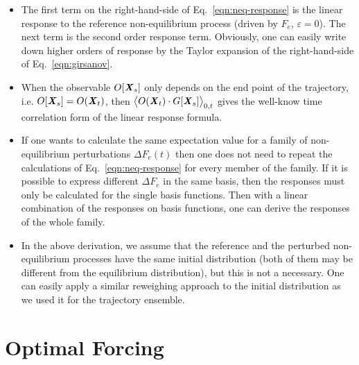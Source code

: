 \documentclass[aip,jcp,a4paper,reprint,onecolumn]{revtex4-1}
\newcommand{\vect}[1]{\textbf{\textit{#1}}}
\newcommand{\eps}{\varepsilon}
\begin{document}
\begin{itemize}
\item The first term on the right-hand-side of Eq.~\eqref{eqn:neq-response} is the linear
  response to the reference non-equilibrium process (driven by $F_e$, $\eps=0$). The next term is the second order response term. Obviously, one can easily write down higher orders of response by the Taylor expansion of the right-hand-side of Eq.~\eqref{eqn:girsanov}.
\item When the observable $O[\vect X_s]$ only depends on the end point of the trajectory, i.e.
  $O[\vect X_s] = O(\vect X_t)$, then $\big\langle O(\vect X_t)\cdot G[\vect X_s]\big\rangle_{0,t}$
  gives the well-know time correlation form of the linear response formula.
\item If one wants to calculate the same expectation value for a family of non-equilibrium perturbations $\Delta F_e(t)$ then 
one does not need to repeat the calculations of Eq.~\eqref{eqn:neq-response} for every member of the family. 
  If it is possible to
  express different $\Delta F_e$ in the same basis, then the responses must only be
  calculated for the single basis functions. Then with a linear combination of the responses on basis functions, one can derive
  the responses of the whole family. 
\item In the above derivation, we assume that the reference and the perturbed non-equilibrium processes
  have the same initial distribution (both of them may be different from the equilibrium distribution),
  but this is not a necessary. One can easily
  apply a similar reweighing approach to the initial distribution as we used it for the trajectory ensemble.
\end{itemize}





\section{Optimal Forcing}
\end{document}
